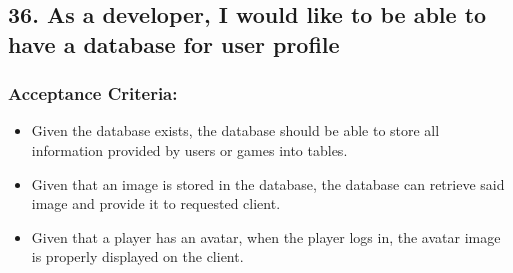 \subsection*{36. As a developer, I would like to be able to have a database for user profile}


\subsubsection*{Acceptance Criteria:}

\begin{itemize}
\item Given the database exists, the database should be able to store all information provided by users or games into tables.
\item Given that an image is stored in the database, the database can retrieve said image and provide it to requested client. 
\item Given that a player has an avatar, when the player logs in, the avatar image is properly displayed on the client.
\end{itemize}
